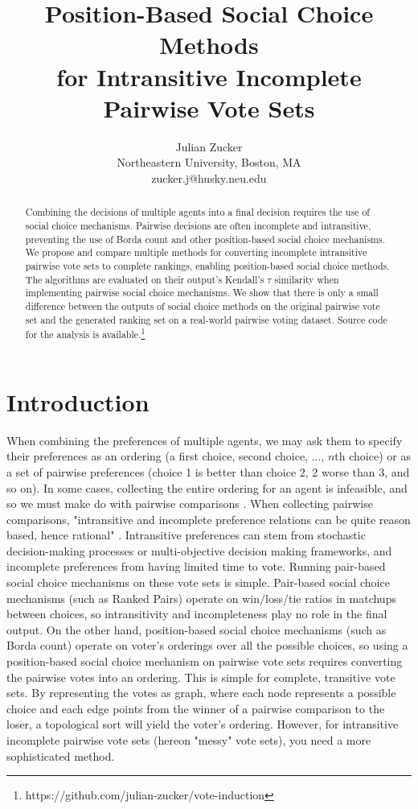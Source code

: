 \documentclass[letterpaper]{article} %
\title{Position-Based Social Choice Methods \\for Intransitive Incomplete Pairwise Vote Sets}
\author{Julian Zucker\\ %
Northeastern University, Boston, MA\\
zucker.j@husky.neu.edu}
\begin{document}
\maketitle

\begin{abstract}
Combining the decisions of multiple agents into a final decision requires the use of social choice mechanisms. Pairwise decisions are often incomplete and intransitive, preventing the use of Borda count and other position-based social choice mechanisms. We propose and compare multiple methods for converting incomplete intransitive pairwise vote sets to complete rankings, enabling position-based social choice methods.  The algorithms are evaluated on their output’s Kendall's $\tau$ similarity when implementing pairwise social choice mechanisms. We show that there is only a small difference between the outputs of social choice methods on the original pairwise vote set and the generated ranking set on a real-world pairwise voting dataset. Source code for the analysis is available.\footnote{https://github.com/julian-zucker/vote-induction}
\end{abstract}

\section{Introduction}
When combining the preferences of multiple agents, we may ask them to specify their preferences as an ordering (a first choice, second choice, ..., $n$th choice) or as a set of pairwise preferences (choice 1 is better than choice 2, 2 worse than 3, and so on). In some cases, collecting the entire ordering for an agent is infeasible, and so we must make do with pairwise comparisons \cite{Saaty2008}. When collecting pairwise comparisons, "intransitive and incomplete preference relations can be quite reason based, hence rational" \cite{Nurmi2014}. Intransitive preferences can stem from stochastic decision-making processes or multi-objective decision making frameworks, and incomplete preferences from having limited time to vote. Running pair-based social choice mechanisms on these vote sets is simple. Pair-based social choice mechanisms (such as Ranked Pairs) operate on win/loss/tie ratios in matchups between choices, so intransitivity and incompleteness play no role in the final output. On the other hand, position-based social choice mechanisms (such as Borda count) operate on voter's orderings over all the possible choices, so using a position-based social choice mechanism on pairwise vote sets requires converting the pairwise votes into an ordering. This is simple for complete, transitive vote sets. By representing the votes as graph, where each node represents a possible choice and each edge points from the winner of a pairwise comparison to the loser, a topological sort will yield the voter's ordering. However, for intransitive incomplete pairwise vote sets (hereon "messy" vote sets), you need a more sophisticated method.
\end{document}

